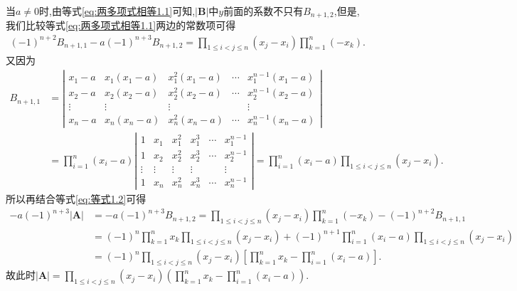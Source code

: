 \documentclass[../../main.tex]{subfiles}
\begin{document}
\begin{solution}
当\(a\neq 0\)时,由等式\eqref{eq:两多项式相等1.1}可知,\(|\boldsymbol{B}|\)中\(y\)前面的系数不只有\(B_{n + 1,2}\),但是,我们比较等式\eqref{eq:两多项式相等1.1}两边的常数项可得
\begin{align}\label{eq:等式1.2}
(-1)^{n + 2}B_{n + 1,1}-a(-1)^{n + 3}B_{n + 1,2}=\prod_{1\leqslant i < j\leqslant n}(x_j - x_i)\prod_{k = 1}^{n}(-x_k).
\end{align}
又因为
\begin{align*}
B_{n + 1,1}&=\left|\begin{matrix}
x_1 - a & x_1(x_1 - a) & x_{1}^{2}(x_1 - a) & \cdots & x_{1}^{n - 1}(x_1 - a)\\
x_2 - a & x_2(x_2 - a) & x_{2}^{2}(x_2 - a) & \cdots & x_{2}^{n - 1}(x_2 - a)\\
\vdots & \vdots & \vdots &  & \vdots\\
x_n - a & x_n(x_n - a) & x_{n}^{2}(x_n - a) & \cdots & x_{n}^{n - 1}(x_n - a)
\end{matrix}\right|
\\
&=\prod_{i = 1}^{n}(x_i - a)\left|\begin{matrix}
1 & x_1 & x_{1}^{2} & x_{1}^{3} & \cdots & x_{1}^{n - 1}\\
1 & x_2 & x_{2}^{2} & x_{2}^{3} & \cdots & x_{2}^{n - 1}\\
\vdots & \vdots & \vdots & \vdots &  & \vdots\\
1 & x_n & x_{n}^{2} & x_{n}^{3} & \cdots & x_{n}^{n - 1}
\end{matrix}\right|=\prod_{i = 1}^{n}(x_i - a)\prod_{1\leqslant i < j\leqslant n}(x_j - x_i).
\end{align*}
所以再结合等式\eqref{eq:等式1.2}可得
\begin{align*}
-a(-1)^{n + 3}|\boldsymbol{A}|&=-a(-1)^{n + 3}B_{n + 1,2}=\prod_{1\leqslant i < j\leqslant n}(x_j - x_i)\prod_{k = 1}^{n}(-x_k)-(-1)^{n + 2}B_{n + 1,1}
\\
&=(-1)^n\prod_{k = 1}^{n}x_k\prod_{1\leqslant i < j\leqslant n}(x_j - x_i)+(-1)^{n + 1}\prod_{i = 1}^{n}(x_i - a)\prod_{1\leqslant i < j\leqslant n}(x_j - x_i)
\\
&=(-1)^n\prod_{1\leqslant i < j\leqslant n}(x_j - x_i)\left[\prod_{k = 1}^{n}x_k-\prod_{i = 1}^{n}(x_i - a)\right].
\end{align*}
故此时\(|\boldsymbol{A}|=\prod_{1\leqslant i < j\leqslant n}(x_j - x_i)\left(\prod_{k = 1}^{n}x_k-\prod_{i = 1}^{n}(x_i - a)\right)\).

\end{solution}
\end{document}
